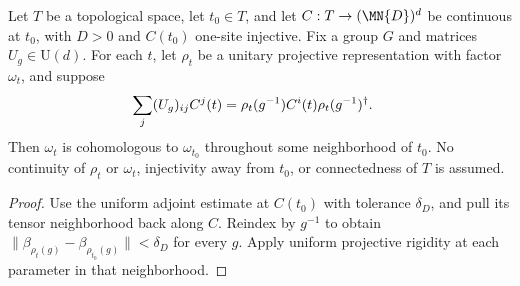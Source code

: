 \begin{lemma}
    \label{thm:spc_aux_local_tensor_class}
    \leanok
    Let $T$ be a topological space, let $t_0\in T$, and let
    $C:T\to(\MN{D})^d$ be continuous at $t_0$, with $D>0$ and $C(t_0)$
    one-site injective. Fix a group $G$ and matrices $U_g\in\mathrm U(d)$.
    For each $t$, let $\rho_t$ be a unitary projective representation with
    factor $\omega_t$, and suppose
    \begin{align}
        \sum_j(U_g)_{ij}C^j(t)
         & =\rho_t(g^{-1})C^i(t)\rho_t(g^{-1})^\dagger.\notag
    \end{align}
    Then $\omega_t$ is cohomologous to $\omega_{t_0}$ throughout some
    neighborhood of $t_0$. No continuity of $\rho_t$ or $\omega_t$,
    injectivity away from $t_0$, or connectedness of $T$ is assumed.
\end{lemma}

\begin{proof}\leanok
    Use the uniform adjoint estimate at $C(t_0)$ with tolerance
    $\delta_D$, and pull its tensor neighborhood back along $C$.
    Reindex by $g^{-1}$ to obtain
    $\|\beta_{\rho_t(g)}-\beta_{\rho_{t_0}(g)}\|<\delta_D$ for every $g$.
    Apply uniform projective rigidity at each parameter in that neighborhood.
\end{proof}

